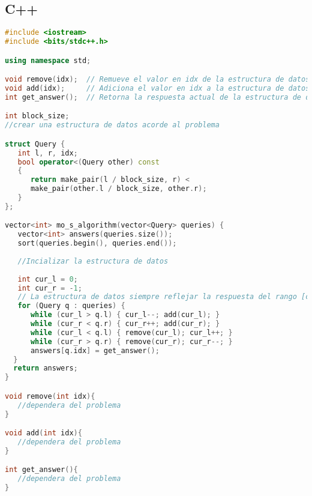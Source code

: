 \subsection{C++}
\begin{lstlisting}[language=C++]
#include <iostream>
#include <bits/stdc++.h>

using namespace std;

void remove(idx);  // Remueve el valor en idx de la estructura de datos
void add(idx);     // Adiciona el valor en idx a la estructura de datos
int get_answer();  // Retorna la respuesta actual de la estructura de datos

int block_size;
//crear una estructura de datos acorde al problema

struct Query {
   int l, r, idx;
   bool operator<(Query other) const
   {
      return make_pair(l / block_size, r) <
      make_pair(other.l / block_size, other.r);
   }
};

vector<int> mo_s_algorithm(vector<Query> queries) {
   vector<int> answers(queries.size());
   sort(queries.begin(), queries.end());
	
   //Incializar la estructura de datos
	
   int cur_l = 0;
   int cur_r = -1;
   // La estructura de datos siempre reflejar la respuesta del rango [cur_l, cur_r]
   for (Query q : queries) {
      while (cur_l > q.l) { cur_l--; add(cur_l); }
	  while (cur_r < q.r) { cur_r++; add(cur_r); }
      while (cur_l < q.l) { remove(cur_l); cur_l++; }
      while (cur_r > q.r) { remove(cur_r); cur_r--; }
      answers[q.idx] = get_answer();
  }
  return answers;
}

void remove(int idx){
   //dependera del problema
}

void add(int idx){
   //dependera del problema
}

int get_answer(){
   //dependera del problema
}
\end{lstlisting}
